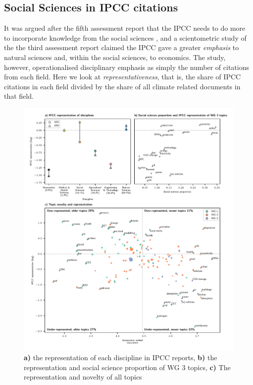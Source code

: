 \documentclass{article}
\begin{document}
\begin{linenumbers}
\subsection*{Social Sciences in IPCC citations}

It was argued after the fifth assessment report that the IPCC needs to do more to incorporate knowledge from the social sciences \cite{Victor2015}, and a scientometric study of the  the third assessment report claimed the IPCC gave a greater \textit{emphasis} to natural sciences and, within the social sciences, to economics. The study, however, operationalised disciplinary emphasis as simply the number of citations from each field. Here we look at \textit{representativeness}, that is, the share of IPCC citations in each field divided by the share of all climate related documents in that field.

\begin{figure}
	\begin{center}
		\includegraphics[width=180mm]{plots_pub/big_panel_representation.pdf}
		\caption{\textbf{a)} the representation of each discipline in IPCC reports, \textbf{b)} the representation and social science proportion of WG 3 topics, \textbf{c)} The representation and novelty of all topics }
		\label{oecd_rep}
	\end{center}
\end{figure}



\end{linenumbers}
\end{document}
